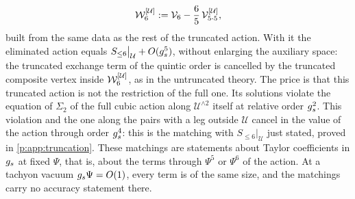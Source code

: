 \begin{equation}
  \label{p:eq:sol:W6-truncated}
  \mathcal{W}_{6}^{[\mathcal U]}
    := \mathcal{V}_{6} - \frac{6}{5} \, \mathcal{V}_{5 \cdot 5}^{[\mathcal U]},
\end{equation}
built from the same data as the rest of the truncated action.
With it the eliminated action equals $S_{\le 6} \big|_{\mathcal U} + O(g_s^5)$, without enlarging the auxiliary space: the truncated exchange term of the quintic order is cancelled by the truncated composite vertex inside $\mathcal{W}_{6}^{[\mathcal U]}$, as in the untruncated theory.
The price is that this truncated action is not the restriction of the full one.
Its solutions violate the equation of $\Sigma_2$ of the full cubic action along $\mathcal U^{\wedge 2}$ itself at relative order $g_s^2$.
This violation and the one along the pairs with a leg outside $\mathcal U$ cancel in the value of the action through order $g_s^4$: this is the matching with $S_{\le 6} \big|_{\mathcal U}$ just stated, proved in \cref{p:app:truncation}.
These matchings are statements about Taylor coefficients in $g_s$ at fixed $\Psi$, that is, about the terms through $\Psi^5$ or $\Psi^6$ of the action.
At a tachyon vacuum $g_s \Psi = O(1)$, every term is of the same size, and the matchings carry no accuracy statement there.

